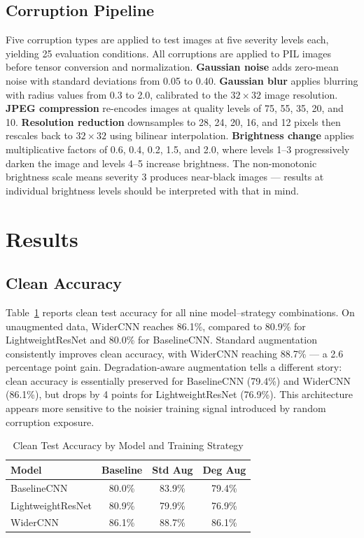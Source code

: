 \documentclass[conference]{IEEEtran}
\begin{document}
\subsection{Corruption Pipeline}

Five corruption types are applied to test images at five severity levels each, yielding 25 evaluation conditions. All corruptions are applied to PIL images before tensor conversion and normalization. \textbf{Gaussian noise} adds zero-mean noise with standard deviations from 0.05 to 0.40. \textbf{Gaussian blur} applies blurring with radius values from 0.3 to 2.0, calibrated to the $32{\times}32$ image resolution. \textbf{JPEG compression} re-encodes images at quality levels of 75, 55, 35, 20, and 10. \textbf{Resolution reduction} downsamples to 28, 24, 20, 16, and 12 pixels then rescales back to $32{\times}32$ using bilinear interpolation. \textbf{Brightness change} applies multiplicative factors of 0.6, 0.4, 0.2, 1.5, and 2.0, where levels 1--3 progressively darken the image and levels 4--5 increase brightness. The non-monotonic brightness scale means severity 3 produces near-black images --- results at individual brightness levels should be interpreted with that in mind.

\section{Results}

\subsection{Clean Accuracy}

Table~\ref{tab:clean} reports clean test accuracy for all nine model--strategy combinations. On unaugmented data, WiderCNN reaches 86.1\%, compared to 80.9\% for LightweightResNet and 80.0\% for BaselineCNN. Standard augmentation consistently improves clean accuracy, with WiderCNN reaching 88.7\% --- a 2.6 percentage point gain. Degradation-aware augmentation tells a different story: clean accuracy is essentially preserved for BaselineCNN (79.4\%) and WiderCNN (86.1\%), but drops by 4 points for LightweightResNet (76.9\%). This architecture appears more sensitive to the noisier training signal introduced by random corruption exposure.

\begin{table}[h]
\caption{Clean Test Accuracy by Model and Training Strategy}
\label{tab:clean}
\centering
\begin{tabular}{lccc}
\toprule
\textbf{Model} & \textbf{Baseline} & \textbf{Std Aug} & \textbf{Deg Aug} \\
\midrule
BaselineCNN       & 80.0\% & 83.9\% & 79.4\% \\
LightweightResNet & 80.9\% & 79.9\% & 76.9\% \\
WiderCNN          & 86.1\% & 88.7\% & 86.1\% \\
\bottomrule
\end{tabular}
\end{table}
\end{document}
